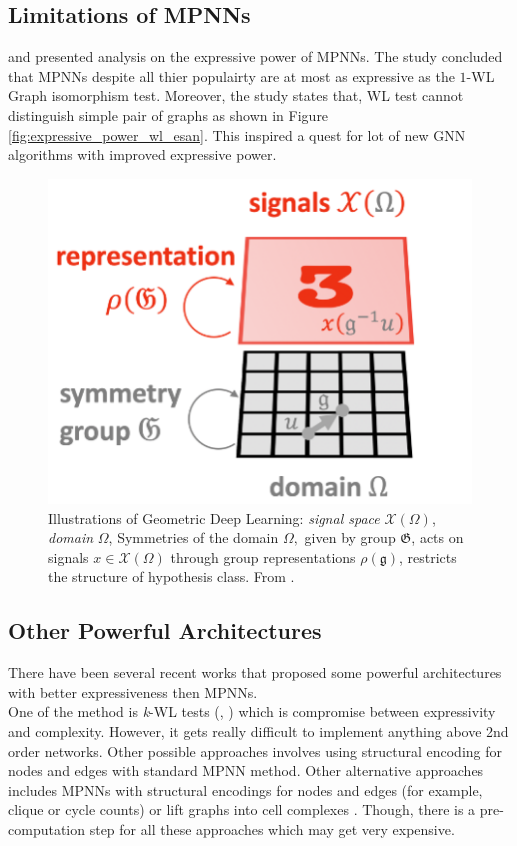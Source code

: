 \documentclass[11pt, dvipsnames, DIV=12]{scrreprt}
\theoremstyle{definition}
\begin{document}
\subsection{Limitations of MPNNs}\label{sec:limit_MPNN}
\citep{christopher_higher_order_gnn_2019} and \citep{xu_power_nn_2019} presented analysis on the expressive power of MPNNs. The study concluded that MPNNs despite all thier populairty are at most as expressive as the $1$-WL Graph isomorphism test. Moreover, the study states that, WL test cannot distinguish simple pair of graphs as shown in Figure \ref{fig:expressive_power_wl_esan}. This inspired a quest for lot of new GNN algorithms with improved expressive power.
\begin{figure}
    \centering
    \includegraphics[width=.50\textwidth]{figures/geometric_priors.png}
    \caption{Illustrations of Geometric Deep Learning: \emph{signal space} $\mathcal{X}(\Omega)$, \emph{domain} $\Omega$, Symmetries of the domain $\Omega, $ given by group $\mathfrak{G}$, acts on signals $x\in\mathcal{X}(\Omega)$ through group representations $\rho(\mathfrak{g})$, restricts the structure of hypothesis class. From \cite{GeometricDL_Bronstein_2021}.}
    \label{fig:geometric_priors}
\end{figure}
\subsection{Other Powerful Architectures}
There have been several recent works that proposed some powerful architectures with better expressiveness then MPNNs. \\ One of the method is \emph{k}-WL tests (\citep{christopher_higher_order_gnn_2019}, \citep{christopher_gosparse_2020}) which is compromise between expressivity and complexity. However, it gets really difficult to implement anything above 2nd order networks. Other possible approaches involves using structural encoding for nodes and edges with standard MPNN method. Other alternative approaches includes MPNNs with structural encodings for nodes and edges (for example, clique or cycle counts) \citep{bouritsas_improv_gnn_2022} or lift graphs into cell complexes \citep{bodnar_weisfeiler_cw_2021a}. Though, there is a pre-computation step for all these approaches which may get very expensive.
\end{document}
